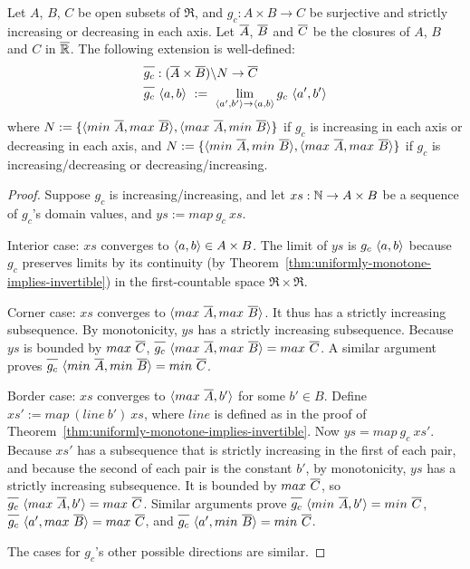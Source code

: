 \begin{theorem}
\label{thm:two-argument-extensions}
Let $A$, $B$, $C$ be open subsets of $\Re$, and $g_c : A \times B \to C$ be surjective and strictly increasing or decreasing in each axis.
Let $\cl{A}$, $\cl{B}$ and $\cl{C}$ be the closures of $A$, $B$ and $C$ in $\cl{\Re}$.
The following extension is well-defined:
\begin{equation}
\begin{aligned}
	&\cl{g_c} : (\cl{A} \times \cl{B}) \w N \to \cl{C} \\
	&\cl{g_c}~\pair{a,b}\ :=\ \lim_{\pair{a',b'} \to \pair{a,b}} g_c~\pair{a',b'}
\end{aligned}
\end{equation}
where $N := \set{\pair{min~\cl{A},max~\cl{B}},\pair{max~\cl{A},min~\cl{B}}}$ if $g_c$ is increasing in each axis or decreasing in each axis, and
$N := \set{\pair{min~\cl{A},min~\cl{B}},\pair{max~\cl{A},max~\cl{B}}}$ if $g_c$ is increasing/decreasing or decreasing/increasing.
\end{theorem}
\begin{proof}
Suppose $g_c$ is increasing/increasing, and let $xs : \mathbb{N} \to A \times B$ be a sequence of $g_c$'s domain values, and $ys := map~g_c~xs$.

Interior case: $xs$ converges to $\langle{a,b}\rangle \in A \times B$.
The limit of $ys$ is $g_c~\langle{a,b}\rangle$ because $g_c$ preserves limits by its continuity (by Theorem~\ref{thm:uniformly-monotone-implies-invertible}) in the first-countable space $\Re \times \Re$.

Corner case: $xs$ converges to $\pair{max~\cl{A},max~\cl{B}}$.
It thus has a strictly increasing subsequence.
By monotonicity, $ys$ has a strictly increasing subsequence.
Because $ys$ is bounded by $max~\cl{C}$, $\cl{g_c}~\pair{max~\cl{A},max~\cl{B}} = max~\cl{C}$.
A similar argument proves $\cl{g_c}~\pair{min~\cl{A},min~\cl{B}} = min~\cl{C}$.

Border case: $xs$ converges to $\pair{max~\cl{A},b'}$ for some $b' \in B$.
Define $xs' := map~(line~b')~xs$, where $line$ is defined as in the proof of Theorem~\ref{thm:uniformly-monotone-implies-invertible}.
Now $ys = map~g_c~xs'$.
Because $xs'$ has a subsequence that is strictly increasing in the first of each pair, and because the second of each pair is the constant $b'$, by monotonicity, $ys$ has a strictly increasing subsequence.
It is bounded by $max~\cl{C}$, so $\cl{g_c}~\pair{max~\cl{A},b'} = max~\cl{C}$.
Similar arguments prove $\cl{g_c}~\pair{min~\cl{A},b'} = min~\cl{C}$, $\cl{g_c}~\pair{a',max~\cl{B}} = max~\cl{C}$, and $\cl{g_c}~\pair{a',min~\cl{B}} = min~\cl{C}$.

The cases for $g_c$'s other possible directions are similar.
\end{proof}


